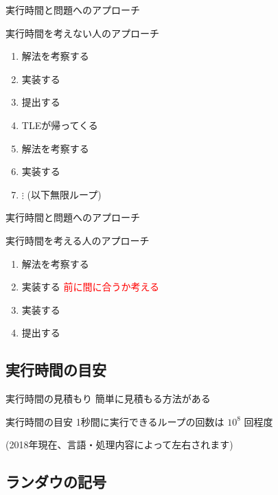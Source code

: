 \documentclass[dvipdfmx]{beamer}
\begin{document}
\begin{frame}{実行時間と問題へのアプローチ}
  \begin{block}{実行時間を考えない人のアプローチ}
  \pause
    \begin{enumerate}
      \item 解法を考察する \pause
      \item 実装する \pause
      \item 提出する \pause
      \item TLEが帰ってくる \pause
      \item 解法を考察する \pause
      \item 実装する \pause
      \item $\vdots$ (以下無限ループ)
    \end{enumerate}
  \end{block}
\end{frame}

\begin{frame}{実行時間と問題へのアプローチ}
  \begin{block}{実行時間を考える人のアプローチ}
    \begin{enumerate}
      \item 解法を考察する
      \item 実装する
      \textcolor{red}{前に間に合うか考える}
      \item 実装する
      \item 提出する
    \end{enumerate}
  \end{block}
\end{frame}

\subsection{実行時間の目安}

\begin{frame}{実行時間の見積もり}
  簡単に見積もる方法がある
  \pause

  \begin{block}{実行時間の目安}
    \centering
    {\Huge 1秒間に実行できるループの回数は $10^8$ 回程度}

    (2018年現在、言語・処理内容によって左右されます)
  \end{block}
\end{frame}

\subsection{ランダウの記号}
\end{document}
